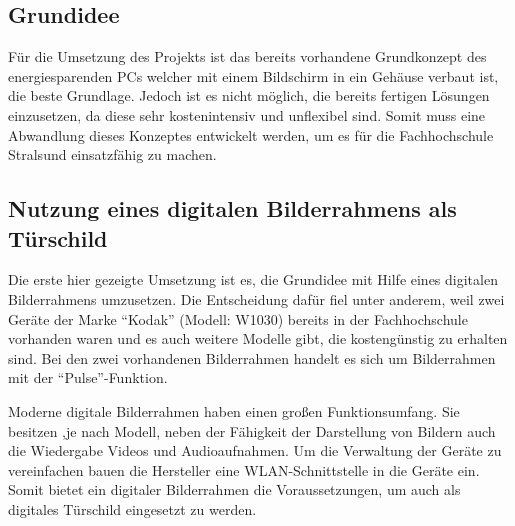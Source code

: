 \begin{flushleft}
\subsection{Grundidee}
Für die Umsetzung des Projekts ist das bereits vorhandene Grundkonzept des energiesparenden PCs welcher mit einem Bildschirm in ein Gehäuse verbaut ist, die beste Grundlage. Jedoch ist es nicht möglich, die bereits fertigen Lösungen einzusetzen, da diese sehr kostenintensiv und unflexibel sind. Somit muss eine Abwandlung dieses Konzeptes entwickelt werden, um es für die Fachhochschule Stralsund einsatzfähig zu machen. 

\subsection{Nutzung eines digitalen Bilderrahmens als Türschild}
Die erste hier gezeigte Umsetzung ist es, die Grundidee mit Hilfe eines digitalen Bilderrahmens umzusetzen. Die Entscheidung dafür fiel unter anderem, weil zwei Geräte der Marke ``Kodak'' (Modell: W1030) bereits in der Fachhochschule vorhanden waren und es auch weitere Modelle gibt, die kostengünstig zu erhalten sind. Bei den zwei vorhandenen Bilderrahmen handelt es sich um Bilderrahmen mit der ``Pulse''-Funktion. 

Moderne digitale Bilderrahmen haben einen großen Funktionsumfang. Sie besitzen ,je nach Modell, neben der Fähigkeit der Darstellung von Bildern auch die Wiedergabe Videos und Audioaufnahmen. Um die Verwaltung der Geräte zu vereinfachen bauen die Hersteller eine WLAN-Schnittstelle in die Geräte ein. Somit bietet ein digitaler Bilderrahmen die Voraussetzungen, um auch als digitales Türschild eingesetzt zu werden. 


\end{flushleft}
